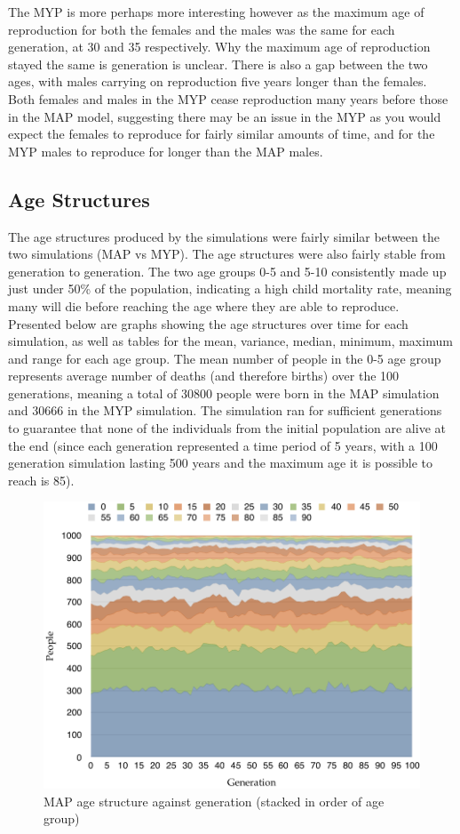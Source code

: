 \documentclass[authoryearcitations]{UoYCSproject}
\begin{document}
The MYP is more perhaps more interesting however as the maximum age of reproduction for both the females and the males was the same for each generation, at 30 and 35 respectively. Why the maximum age of reproduction stayed the same is generation is unclear. There is also a gap between the two ages, with males carrying on reproduction five years longer than the females. Both females and males in the MYP cease reproduction many years before those in the MAP model, suggesting there may be an issue in the MYP as you would expect the females to reproduce for fairly similar amounts of time, and for the MYP males to reproduce for longer than the MAP males.

\subsection{Age Structures}
The age structures produced by the simulations were fairly similar between the two simulations (MAP vs MYP). The age structures were also fairly stable from generation to generation. The two age groups 0-5 and 5-10 consistently made up just under 50\% of the population, indicating a high child mortality rate, meaning many will die before reaching the age where they are able to reproduce. Presented below are graphs showing the age structures over time for each simulation, as well as tables for the mean, variance, median, minimum, maximum and range for each age group. The mean number of people in the 0-5 age group represents average number of deaths (and therefore births) over the 100 generations, meaning a total of 30800 people were born in the MAP simulation and 30666 in the MYP simulation. The simulation ran for sufficient generations to guarantee that none of the individuals from the initial population are alive at the end (since each generation represented a time period of 5 years, with a 100 generation simulation lasting 500 years and the maximum age it is possible to reach is 85).

\begin{figure}[h]
\includegraphics[scale=0.6]{map_age_data}
\caption{MAP age structure against generation (stacked in order of age group)}
\label{fig:mapResultsGraph}
\end{figure}
\end{document}
